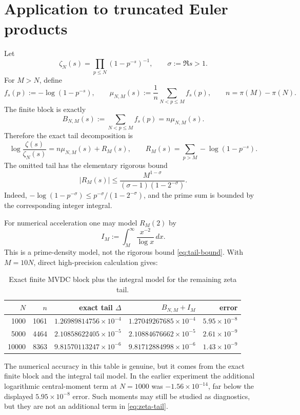 \documentclass[11pt,a4paper]{article}
\begin{document}
\section{Application to truncated Euler products}

Let
\[
  \zeta_N(s)=\prod_{p\le N}(1-p^{-s})^{-1},
  \qquad \sigma:=\Re s>1.
\]
For \(M>N\), define
\[
  f_s(p):=-\log(1-p^{-s}),\qquad
  \mu_{N,M}(s):=\frac1n\sum_{N<p\le M}f_s(p),
  \qquad n=\pi(M)-\pi(N).
\]
The finite block is exactly
\[
  B_{N,M}(s):=\sum_{N<p\le M}f_s(p)=n\mu_{N,M}(s).
\]
Therefore the exact tail decomposition is
\begin{equation}\label{eq:zeta-tail}
  \log\frac{\zeta(s)}{\zeta_N(s)}
  =n\mu_{N,M}(s)+R_M(s),
  \qquad
  R_M(s)=\sum_{p>M}-\log(1-p^{-s}).
\end{equation}
The omitted tail has the elementary rigorous bound
\begin{equation}\label{eq:tail-bound}
  |R_M(s)|
  \le
  \frac{M^{1-\sigma}}
  {(\sigma-1)(1-2^{-\sigma})}.
\end{equation}
Indeed,
\(-\log(1-p^{-\sigma})\le p^{-\sigma}/(1-2^{-\sigma})\),
and the prime sum is bounded by the corresponding integer integral.

For numerical acceleration one may model \(R_M(2)\) by
\[
  I_M:=\int_M^\infty\frac{x^{-2}}{\log x}\,dx.
\]
This is a prime-density model, not the rigorous bound
\eqref{eq:tail-bound}.  With \(M=10N\), direct high-precision
calculation gives:

\begin{table}[ht]
\centering
\begin{tabular}{rrrrr}
\toprule
\(N\) & \(n\) & exact tail \(\Delta\) & \(B_{N,M}+I_M\) & error \\
\midrule
1000  & 1061 & \(1.26989814756\times10^{-4}\)
              & \(1.27049267685\times10^{-4}\) & \(5.95\times10^{-8}\) \\
5000  & 4464 & \(2.10858622405\times10^{-5}\)
              & \(2.10884676662\times10^{-5}\) & \(2.61\times10^{-9}\) \\
10000 & 8363 & \(9.81570113247\times10^{-6}\)
              & \(9.81712884998\times10^{-6}\) & \(1.43\times10^{-9}\) \\
\bottomrule
\end{tabular}
\caption{Exact finite MVDC block plus the integral model for the remaining zeta tail.}
\end{table}

The numerical accuracy in this table is genuine, but it comes from the
exact finite block and the integral tail model.  In the earlier
experiment the additional logarithmic central-moment term at \(N=1000\)
was \(-1.56\times10^{-14}\), far below the displayed
\(5.95\times10^{-8}\) error.  Such moments may still be studied as
diagnostics, but they are not an additional term in
\eqref{eq:zeta-tail}.
\end{document}
